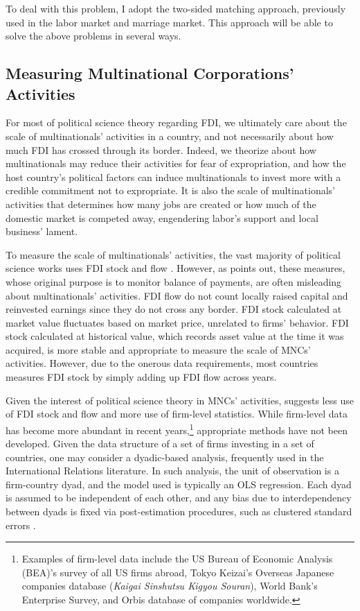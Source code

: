To deal with this problem, I adopt the two-sided matching approach, previously used in the labor market and marriage market. This approach will be able to solve the above problems in several ways.

\subsection{Measuring Multinational Corporations' Activities}

For most of political science theory regarding FDI, we ultimately care about the scale of multinationals' activities in a country, and not necessarily about how much FDI has crossed through its border. Indeed, we theorize about how multinationals may reduce their activities for fear of expropriation, and how the host country's political factors can induce multinationals to invest more with a credible commitment not to expropriate. It is also the scale of multinationals' activities that determines how many jobs are created or how much of the domestic market is competed away, engendering labor's support and local business' lament.

To measure the scale of multinationals' activities, the vast majority of political science works uses FDI stock and flow \citep{Jensen2003, Ahlquist2006, Beazer2011, Graham2010}. However, as \citet{Kerner2014} points out, these measures, whose original purpose is to monitor balance of payments, are often misleading about multinationals' activities. FDI flow do not count locally raised capital and reinvested earnings since they do not cross any border. FDI stock calculated at market value fluctuates based on market price, unrelated to firms' behavior. FDI stock calculated at historical value, which records asset value at the time it was acquired, is more stable and appropriate to measure the scale of MNCs' activities. However, due to the onerous data requirements, most countries measures FDI stock by simply adding up FDI flow across years.

Given the interest of political science theory in MNCs' activities, \citet{Kerner2014} suggests less use of FDI stock and flow and more use of firm-level statistics. While firm-level data has become more abundant in recent years,\footnote{Examples of firm-level data include the US Bureau of Economic Analysis (BEA)'s survey of all US firms abroad, Tokyo Keizai's Overseas Japanese companies database (\textit{Kaigai Sinshutsu Kigyou Souran}), World Bank's Enterprise Survey, and Orbis database of companies worldwide.} appropriate methods have not been developed. Given the data structure of a set of firms investing in a set of countries, one may consider a dyadic-based analysis, frequently used in the International Relations literature. In such analysis, the unit of observation is a firm-country dyad, and the model used is typically an OLS regression. Each dyad is assumed to be independent of each other, and any bias due to interdependency between dyads is fixed via post-estimation procedures, such as clustered standard errors \citep{Dorff2013}. 

